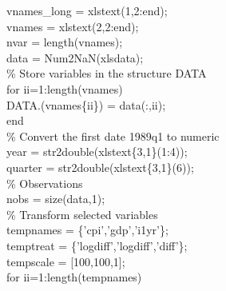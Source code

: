 \hspace{1mm}vnames\_long = xlstext(1,2:end); \\ 
\hspace{1mm}vnames = xlstext(2,2:end); \\ 
\hspace{1mm}nvar = length(vnames); \\ 
\hspace{1mm}data   = Num2NaN(xlsdata); \\ 
\hspace{1mm}\textcolor{matlabgreen}{\% Store variables in the structure DATA }\\ 
\hspace{1mm}\textcolor{matlabblue}{for} ii=1:length(vnames) \\ 
\hspace{1mm}\hspace{5mm} DATA.(vnames\{ii\}) = data(:,ii); \\ 
\hspace{1mm}\textcolor{matlabblue}{end} \\ 
\hspace{1mm}\textcolor{matlabgreen}{\% Convert the first date 1989q1 to numeric }\\ 
\hspace{1mm}year = str2double(xlstext\{3,1\}(1:4)); \\ 
\hspace{1mm}quarter = str2double(xlstext\{3,1\}(6)); \\ 
\hspace{1mm}\textcolor{matlabgreen}{\% Observations }\\ 
\hspace{1mm}nobs = size(data,1); \\ 
\hspace{1mm}\textcolor{matlabgreen}{\% Transform selected variables }\\ 
\hspace{1mm}tempnames = \{\textcolor{matlabpurple}{'cpi'},\textcolor{matlabpurple}{'gdp'},\textcolor{matlabpurple}{'i1yr'}\}; \\ 
\hspace{1mm}temptreat = \{\textcolor{matlabpurple}{'logdiff'},\textcolor{matlabpurple}{'logdiff'},\textcolor{matlabpurple}{'diff'}\}; \\ 
\hspace{1mm}tempscale = [100,100,1]; \\ 
\hspace{1mm}\textcolor{matlabblue}{for} ii=1:length(tempnames) \\ 
